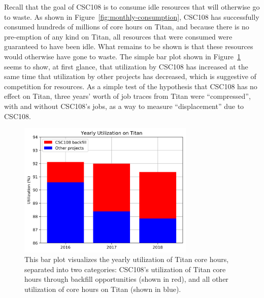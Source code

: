  Recall
that the goal of CSC108 is to consume idle resources that will otherwise go to
waste. 
 As shown in
Figure~\ref{fig:monthly-consumption}, CSC108 has successfully consumed
hundreds of millions of core hours on Titan, and because there is no
pre-emption of any kind on Titan, all resources that were consumed were
guaranteed to have been idle. What remains to be shown is that these resources
would otherwise have gone to waste. The simple bar plot shown in
Figure~\ref{fig:jacks-slide} seems to show, at first glance, that utilization
by CSC108 has increased at the same time that utilization by other projects
has decreased, which is suggestive of competition for resources. As a simple
test of the hypothesis that CSC108 has no effect on Titan, three years' worth
of job traces from Titan were ``compressed'', with and without CSC108's jobs,
as a way to measure ``displacement'' due to CSC108.


\begin{figure}
  \includegraphics[width=0.75\textwidth]{images/barplot-jacks-slide.png}
\caption{This bar plot visualizes the yearly utilization of Titan core hours,
separated into two categories: CSC108's utilization of Titan core hours through
backfill opportunities (shown in red), and all other utilization of core hours
on Titan (shown in blue).}
\label{fig:jacks-slide}
\end{figure}

